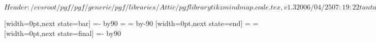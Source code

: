 \ProvidesPackageRCS[v\pgfversion] $Header: /cvsroot/pgf/pgf/generic/pgf/libraries/Attic/pgflibrarytikzmindmap.code.tex,v 1.3 2006/04/25 07:19:22 tantau Exp $

%




%

{
  [width=0pt,next state=bar]
  {
    {
    \pgftransformxshift{-1pt}%
    \pgftransformxshift{-\pgfsnakecirclestartradius}%
    \pgfpathmoveto{\pgfpointpolar{\pgfsnakesegmentangle}{\pgfsnakecirclestartradius}}
    \pgfpatharc{\pgfsnakesegmentangle}{-\pgfsnakesegmentangle}{\pgfsnakecirclestartradius}
    \@tempcnta=-\pgfsnakesegmentangle\relax
    \advance\@tempcnta by90\relax
    \@tempdima=\pgfsnakecirclestartradius\relax
    \pgfpathcurveto
    {\pgfpointadd
      {\pgfpointpolar{-\pgfsnakesegmentangle}{\pgfsnakecirclestartradius}}
      {}}
    {}
    {}
    \@tempcnta=\pgfsnakesegmentangle\relax
    \advance\@tempcnta by-90\relax
    \pgfpathcurveto
    {}
    {\pgfpointadd
      {\pgfpointpolar{\pgfsnakesegmentangle}{\pgfsnakecirclestartradius}}
      {}}
    {\pgfpointpolar{\pgfsnakesegmentangle}{\pgfsnakecirclestartradius}}
    \pgfpathclose
    }
  }
  [width=0pt,next state=end]
  {
    \@tempdima=\pgfsnakecirclestartradius\relax
    \@tempdimb=\pgfsnakecircleendradius\relax
    \pgfpathrectangle
    {}
    {}
  }
  [width=0pt,next state=final]
  {
    {
    \pgftransformxshift{\pgfsnakeremainingdistance}%
    \pgftransformxshift{1pt}%
    \pgftransformxshift{-\pgfsnakecircleendradius}%
    \pgfpathmoveto{\pgfpointpolar{\pgfsnakesegmentangle}{\pgfsnakecircleendradius}}
    \pgfpatharc{\pgfsnakesegmentangle}{-\pgfsnakesegmentangle}{\pgfsnakecircleendradius}
    \@tempcnta=-\pgfsnakesegmentangle\relax
    \advance\@tempcnta by90\relax
}}}
